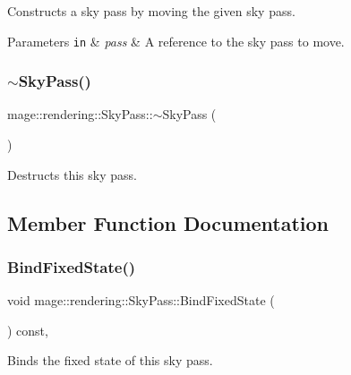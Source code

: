 Constructs a sky pass by moving the given sky pass.


\begin{DoxyParams}[1]{Parameters}
\mbox{\tt in}  & {\em pass} & A reference to the sky pass to move. \\
\hline
\end{DoxyParams}
\hypertarget{classmage_1_1rendering_1_1_sky_pass_a99473ca11c0c25ab0608a3f93cf30aa6}{}\label{classmage_1_1rendering_1_1_sky_pass_a99473ca11c0c25ab0608a3f93cf30aa6} 
\subsubsection{\texorpdfstring{$\sim$\+Sky\+Pass()}{~SkyPass()}}
{\footnotesize\ttfamily mage\+::rendering\+::\+Sky\+Pass\+::$\sim$\+Sky\+Pass (\begin{DoxyParamCaption}{ }\end{DoxyParamCaption})\hspace{0.3cm}{\ttfamily [default]}}

Destructs this sky pass. 

\subsection{Member Function Documentation}
\hypertarget{classmage_1_1rendering_1_1_sky_pass_ab2e7bf506b3a038264579aa3c494f14d}{}\label{classmage_1_1rendering_1_1_sky_pass_ab2e7bf506b3a038264579aa3c494f14d} 
\subsubsection{\texorpdfstring{Bind\+Fixed\+State()}{BindFixedState()}}
{\footnotesize\ttfamily void mage\+::rendering\+::\+Sky\+Pass\+::\+Bind\+Fixed\+State (\begin{DoxyParamCaption}{ }\end{DoxyParamCaption}) const\hspace{0.3cm}{\ttfamily [private]}, {\ttfamily [noexcept]}}

Binds the fixed state of this sky pass. \hypertarget{classmage_1_1rendering_1_1_sky_pass_a8364836c5db0dc3e9894e1749ab302e8}{}\label{classmage_1_1rendering_1_1_sky_pass_a8364836c5db0dc3e9894e1749ab302e8} 
